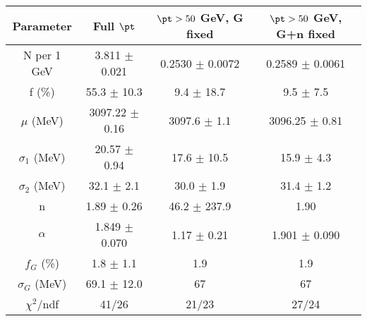 \begin{tabular}{c||c|c|c}
Parameter & Full $\pt$ & $\pt>50$ GeV, G fixed & $\pt>50$ GeV, G+n fixed \\
\hline
N per 1 GeV & 3.811 $\pm$ 0.021 & 0.2530 $\pm$ 0.0072 & 0.2589 $\pm$ 0.0061\\
f (\%) & 55.3 $\pm$ 10.3 & 9.4 $\pm$ 18.7 & 9.5 $\pm$ 7.5\\
$\mu$ (MeV) & 3097.22 $\pm$ 0.16 & 3097.6 $\pm$ 1.1 & 3096.25 $\pm$ 0.81\\
$\sigma_1$ (MeV) & 20.57 $\pm$ 0.94 & 17.6 $\pm$ 10.5 & 15.9 $\pm$ 4.3\\
$\sigma_2$ (MeV) & 32.1 $\pm$ 2.1 & 30.0 $\pm$ 1.9 & 31.4 $\pm$ 1.2\\
n & 1.89 $\pm$ 0.26 & 46.2 $\pm$ 237.9 & 1.90\\
$\alpha$ & 1.849 $\pm$ 0.070 & 1.17 $\pm$ 0.21 & 1.901 $\pm$ 0.090\\
$f_G$ (\%) & 1.8 $\pm$ 1.1 & 1.9 & 1.9\\
$\sigma_G$ (MeV) & 69.1 $\pm$ 12.0 & 67 & 67\\
\hline
$\chi^2$/ndf & 41/26 & 21/23 & 27/24\\
\end{tabular}

